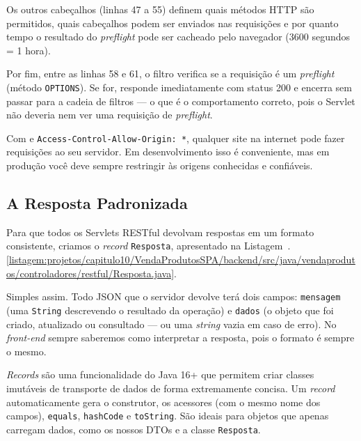 Os outros cabeçalhos (linhas 47 a 55) definem quais métodos HTTP são permitidos, quais cabeçalhos podem ser enviados nas requisições e por quanto tempo o resultado do \textit{preflight} pode ser cacheado pelo navegador (3600 segundos = 1 hora).

Por fim, entre as linhas 58 e 61, o filtro verifica se a requisição é um \textit{preflight} (método \texttt{OPTIONS}). Se for, responde imediatamente com status 200 e encerra sem passar para a cadeia de filtros --- o que é o comportamento correto, pois o Servlet não deveria nem ver uma requisição de \textit{preflight}.

\begin{atencao}
    Com  e \texttt{Access-Control-Allow-Origin: *}, qualquer site na internet pode fazer requisições ao seu servidor. Em desenvolvimento isso é conveniente, mas em produção você deve sempre restringir às origens conhecidas e confiáveis.
\end{atencao}


\subsection{A Resposta Padronizada}

Para que todos os Servlets RESTful devolvam respostas em um formato consistente, criamos o \textit{record} \texttt{Resposta}, apresentado na Listagem~\thechapter.\ref{listagem:projetos/capitulo10/VendaProdutosSPA/backend/src/java/vendaprodutos/controladores/restful/Resposta.java}.


Simples assim. Todo JSON que o servidor devolve terá dois campos: \texttt{mensagem} (uma \texttt{String} descrevendo o resultado da operação) e \texttt{dados} (o objeto que foi criado, atualizado ou consultado --- ou uma \textit{string} vazia em caso de erro). No \textit{front-end} sempre saberemos como interpretar a resposta, pois o formato é sempre o mesmo.

\begin{saibaMais}
    \textit{Records} são uma funcionalidade do Java 16+ que permitem criar classes imutáveis de transporte de dados de forma extremamente concisa. Um \textit{record} automaticamente gera o construtor, os acessores (com o mesmo nome dos campos), \texttt{equals}, \texttt{hashCode} e \texttt{toString}. São ideais para objetos que apenas carregam dados, como os nossos DTOs e a classe \texttt{Resposta}.
\end{saibaMais}


